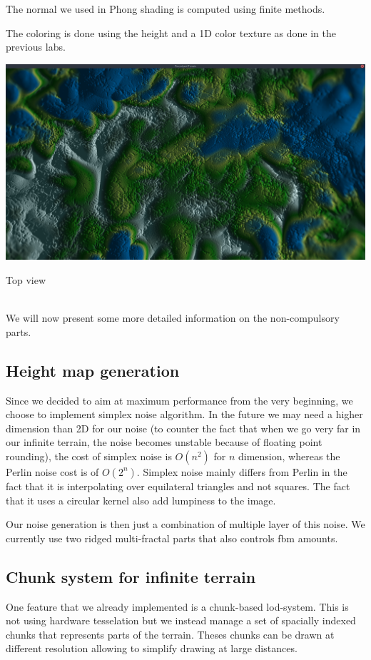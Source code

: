 \documentclass[11pt]{article}
\begin{document}
The normal we used in Phong shading is computed using finite methods.

The coloring is done using the height and a 1D color texture as done in the
previous labs.\\

\begin{center}
\includegraphics[width=\textwidth]{screen02}
\caption{Top view}
\end{center} \\

We will now present some more detailed information on the non-compulsory parts.

\subsection{Height map generation}
Since we decided to aim at maximum performance from the very beginning, we
choose to implement simplex noise algorithm. In the future we may need a higher
dimension than 2D for our noise (to counter the fact that when we go very far in
our infinite terrain, the noise becomes unstable because of floating point
rounding), the cost of simplex noise is $O(n^2)$ for $n$ dimension, whereas the
Perlin noise cost is of $O(2^n)$. Simplex noise mainly differs from Perlin in the fact that it is interpolating over equilateral triangles and not squares. The fact that it uses a circular kernel also add lumpiness to the image.

Our noise generation is then just a combination of multiple layer of this noise.
We currently use two ridged multi-fractal parts that also controls fbm amounts.
\subsection{Chunk system for infinite terrain}
One feature that we already implemented is a chunk-based lod-system. This is not using hardware tesselation but we instead manage a set of spacially indexed chunks that represents parts of the terrain. Theses chunks can be drawn at different resolution allowing to simplify drawing at large distances.
\end{document}
